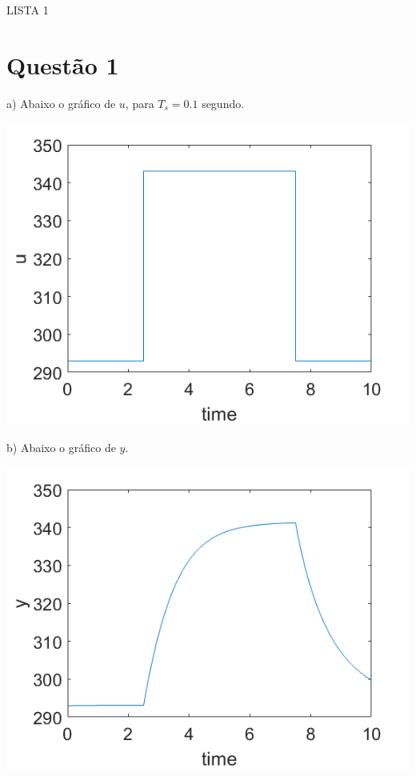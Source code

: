 \documentclass{rbfin}
\begin{document}
\rbfe{}


\large

\begin{center}
LISTA 1
\end{center}

\normalsize

\doublespacing

\section*{Questão 1}

a) Abaixo o gráfico de $u$, para $T_s = 0.1$ segundo.

\begin{center}
\includegraphics[scale=0.666]{q1a}
\end{center}

b) Abaixo o gráfico de $y$.

\begin{center}
\includegraphics[scale=0.666]{q1b}
\end{center}
\end{document}
